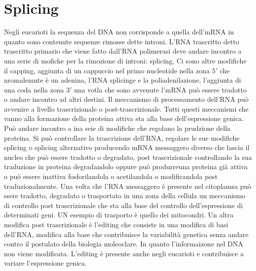 \chapter{Splicing}
Negli eucarioti la sequenza del DNA non corrisponde a quella dell'mRNA in quanto sono contenute sequenze rimosse dette introni. L'RNA trascritto detto trascritto primario che viene 
fatto dall'RNA polimerasi deve andare incontro a una serie di mofiche per la rimozione di introni: splicing. Ci sono altre modifiche il capping, aggiunta di un cappuccio nel primo
nucleotide nella zona $5'$ che nromalemnte \`e un adenina, l'RNA splicinge e la poliadenilazione, l'aggiunta di una coda nella zona $3'$ una votla che sono avvenute l'mRNA pu\`o 
essere tradotto o andare incontro ad altri destini. Il meccanismo di processamento dell'RNA pu\`o avvenire a livello trascrizionale o post-trascrizionale. Tutti questi meccanismi 
che vanno alla formazione della proteina attiva sta alla base dell'espressione genica. Pu\`o andare incontro a ina seie di modifiche che regolano la prudzione della proteina. Si pu\`o 
controllare la trascrizione dell'RNA, regolare le sue modifiche splicing o splicing alternativo producendo mRNA messaggero diverso che lascia il nucleo che pu\`o essere tradotto o 
degradato, post trascrizionale controllando la sua traduzione in proteina degradandolo oppure pu\`o produrreuna proteina gi\`a attiva o pu\`o essere inattiva fosforilandola o 
acetilandola o modificandola post traduzionalmente. Una volta che l'RNA messaggero \`e presente nel citoplamsa pu\`o ssere tradotto, degradato o trasportato in una zona della cellula
un meccanismo di controllo post trascrizionale che sta alla base del controllo dell'espressione di determinati geni. UN esempio di trasporto \`e quello dei mitocondri. Un altra modifica
post trascrizionale \`e l'editing che consiste in una modifica di basi dell'RNA, modifica alla base che contribuisce la variabilit\`a genetica senza andare contro il postulato della 
biologia moleoclare. In quanto l'informaizone nel DNA non viene modificata. L'editing \`e presente anche negli eucarioti e contribuisce a variare l'espressione genica. 
